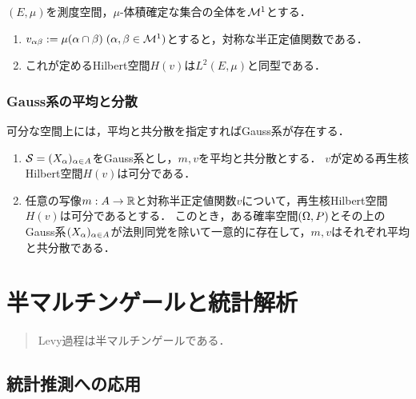 \documentclass[uplatex,dvipdfmx]{jsreport}
\begin{document}
\begin{theorem}
    $(E,\mu)$を測度空間，$\mu$-体積確定な集合の全体を$\mathcal{M}^1$とする．
    \begin{enumerate}
        \item $v_{\alpha\beta}:=\mu(\alpha\cap\beta)\;(\alpha,\beta\in\mathcal{M}^1)$とすると，対称な半正定値関数である．
        \item これが定めるHilbert空間$H(v)$は$L^2(E,\mu)$と同型である．
    \end{enumerate}
\end{theorem}

\subsection{Gauss系の平均と分散}

\begin{tcolorbox}[colframe=ForestGreen, colback=ForestGreen!10!white,breakable,colbacktitle=ForestGreen!40!white,coltitle=black,fonttitle=\bfseries\sffamily,
title=]
    可分な空間上には，平均と共分散を指定すればGauss系が存在する．
\end{tcolorbox}

\begin{theorem}\mbox{}
    \begin{enumerate}
        \item $\mathcal{S}=(X_\alpha)_{\alpha\in A}$をGauss系とし，$m,v$を平均と共分散とする．
        $v$が定める再生核Hilbert空間$H(v)$は可分である．
        \item 任意の写像$m:A\to\mathbb{R}$と対称半正定値関数$v$について，再生核Hilbert空間$H(v)$は可分であるとする．
        このとき，ある確率空間$(\Omega,P)$とその上のGauss系$(X_\alpha)_{\alpha\in A}$が法則同党を除いて一意的に存在して，$m,v$はそれぞれ平均と共分散である．
    \end{enumerate}
\end{theorem}

\chapter{半マルチンゲールと統計解析}

\begin{quotation}
    Levy過程は半マルチンゲールである．
\end{quotation}

\section{統計推測への応用}
\end{document}
